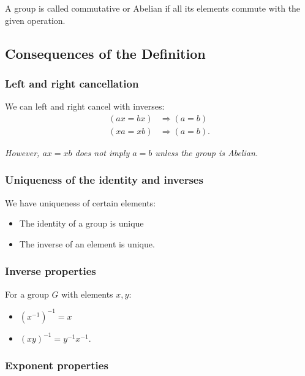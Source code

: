 \documentclass[a4paper, 12pt, twoside]{article}
\begin{document}
A group is called commutative or Abelian if all its elements commute with
the given operation.

\subsection{Consequences of the Definition}

\subsubsection{Left and right cancellation}

We can left and right cancel with inverses:
\begin{align*}
      (ax = bx) & \Rightarrow (a = b) \tag{$\forall a, b, x \in G$}  \\
      (xa = xb) & \Rightarrow (a = b). \tag{$\forall a, b, x \in G$}
\end{align*}

\textit{However, $ax = xb$ does not imply $a = b$ unless the group is Abelian.}

\subsubsection{Uniqueness of the identity and inverses}

We have uniqueness of certain elements:

\begin{itemize}
      \item The identity of a group is unique
      \item The inverse of an element is unique.
\end{itemize}

\subsubsection{Inverse properties}

For a group $G$ with elements $x, y$:

\begin{itemize}
      \item $(x^{-1})^{-1} = x$
      \item $(xy)^{-1} = y^{-1}x^{-1}$.
\end{itemize}

\subsubsection{Exponent properties}
\end{document}
